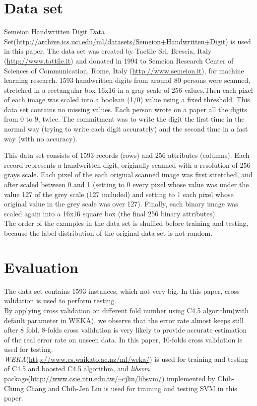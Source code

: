 \documentclass[a4paper,11pt]{article}
\begin{document}
\section{Data set}
Semeion Handwritten Digit Data Set(\url{http://archive.ics.uci.edu/ml/datasets/Semeion+Handwritten+Digit}) is used in this paper. The data set was created by Tactile Srl, Brescia, Italy (\url{http://www.tattile.it}) and donated in 1994 to Semeion Research Center of Sciences of Communication, Rome, Italy (\url{http://www.semeion.it}), for machine learning research.
1593 handwritten digits from around 80 persons were scanned, stretched in a rectangular box 16x16 in a gray scale of 256 values.Then each pixel of each image was scaled into a boolean (1/0) value using a fixed threshold. This data set contains no missing values.
Each person wrote on a paper all the digits from 0 to 9, twice. The commitment was to write the digit the first time in the normal way (trying to write each digit accurately) and the second time in a fast way (with no accuracy).

This data set consists of 1593 records (rows) and 256 attributes (columns).
Each record represents a handwritten digit, originally scanned with a resolution of 256 grays scale.
Each pixel of the each original scanned image was first stretched, and after scaled between 0 and 1 (setting to 0 every pixel whose value was under the value 127 of the grey scale (127 included) and setting to 1 each pixel whose original value in the grey scale was over 127).
Finally, each binary image was scaled again into a 16x16 square box (the final 256 binary attributes).\\
The order of the examples in the data set is shuffled before training and testing, because the label distribution of the original data set is not random.
\section{Evaluation}

The data set contains 1593 instances, which not very big. In this paper, cross validation is used to perform testing. \\
By applying cross validation on different fold number using C4.5 algorithm(with default parameter in WEKA), we observe that the error rate almost keeps still after 8 fold. 8-folds cross validation is very likely to provide accurate estimation of the real error rate on unseen data. In this paper, 10-folds cross validation is used for testing.\\
\emph{WEKA}(\url{http://www.cs.waikato.ac.nz/ml/weka/}) is used for training and testing of C4.5 and boosted C4.5 algorithm, and \emph{libsvm} package(\url{http://www.csie.ntu.edu.tw/~cjlin/libsvm/}) implemented by Chih-Chung Chang and Chih-Jen Lin is used for training and testing SVM in this paper.\\
\end{document}
